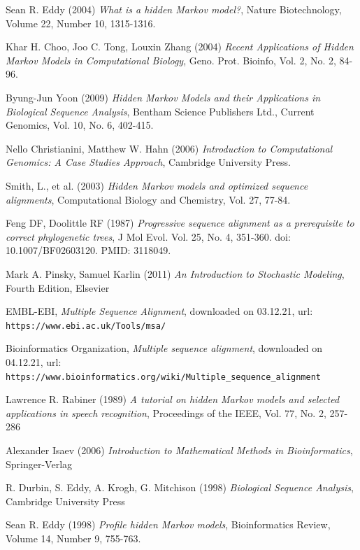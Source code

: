 \documentclass{article}\usepackage[]{graphicx}\usepackage[]{color}
\begin{document}
\begin{thebibliography}{20}
Sean R. Eddy (2004) \emph{What is a hidden Markov model?}, Nature Biotechnology, Volume 22, Number 10, 1315-1316.

Khar H. Choo, Joo C. Tong, Louxin Zhang (2004) \emph{Recent Applications of Hidden Markov Models in Computational Biology}, Geno. Prot. Bioinfo, Vol. 2, No. 2, 84-96.

Byung-Jun Yoon (2009) \emph{Hidden Markov Models and their Applications in Biological Sequence Analysis}, Bentham Science Publishers Ltd., Current Genomics, Vol. 10, No. 6, 402-415.

Nello Christianini, Matthew W. Hahn (2006) \emph{Introduction to Computational Genomics: A Case Studies Approach}, Cambridge University Press.

Smith, L., et al. (2003) \emph{Hidden Markov models and optimized sequence alignments}, Computational Biology and Chemistry, Vol. 27, 77-84.

Feng DF, Doolittle RF (1987) \emph{Progressive sequence alignment as a prerequisite to correct phylogenetic trees}, J Mol Evol. Vol. 25, No. 4, 351-360. doi: 10.1007/BF02603120. PMID: 3118049.

Mark A. Pinsky, Samuel Karlin (2011) \emph{An Introduction to Stochastic Modeling}, Fourth Edition, Elsevier

EMBL-EBI, \emph{Multiple Sequence Alignment}, downloaded on 03.12.21, 
url: \verb$https://www.ebi.ac.uk/Tools/msa/$

Bioinformatics Organization, \emph{Multiple sequence alignment}, downloaded on 04.12.21, 
url: \verb$https://www.bioinformatics.org/wiki/Multiple_sequence_alignment$


Lawrence R. Rabiner (1989) \emph{A tutorial on hidden Markov models and selected applications in speech recognition}, Proceedings of the IEEE, Vol. 77, No. 2, 257-286

Alexander Isaev (2006) \emph{Introduction to Mathematical Methods in Bioinformatics}, Springer-Verlag

R. Durbin, S. Eddy, A. Krogh, G. Mitchison (1998) \emph{Biological Sequence Analysis}, Cambridge University Press

Sean R. Eddy (1998) \emph{Profile hidden Markov models}, Bioinformatics Review, Volume 14, Number 9, 755-763.


\end{thebibliography}
\end{document}
